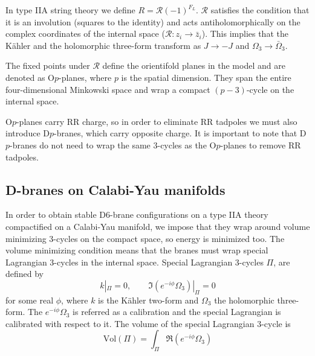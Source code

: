 In type IIA string theory we define $R=\mathcal R (-1)^{F_L}$.
$\mathcal R$ satisfies the condition that it is an involution (squares to the identity) and 
acts antiholomorphically on the complex coordinates of the internal space ($\mathcal R: z_i \to \bar z_i$).
This implies that the Kähler and the holomorphic three-form transform as $J\to -J$ and $\Omega_3 \to \bar \Omega_3$.



The fixed points under $\mathcal R$ define the orientifold planes in the model and are denoted
as O$p$-planes, where $p$ is the spatial dimension.
They span the entire four-dimensional Minkowski space and wrap a compact $(p-3)$-cycle on the internal space.

O$p$-planes carry RR charge, so in order to eliminate RR tadpoles we must also introduce D$p$-branes,
which carry opposite charge.
It is important to note that D$p$-branes do not need to wrap the same 3-cycles as the O$p$-planes
to remove RR tadpoles.


\subsection{D-branes on Calabi-Yau manifolds}

In order to obtain stable D6-brane configurations on a type IIA theory compactified on a Calabi-Yau manifold, 
we impose that they wrap around volume minimizing 3-cycles on the compact space, so energy is minimized too.
The volume minimizing condition means that the branes must wrap special Lagrangian 3-cycles in the internal space.
Special Lagrangian 3-cycles $\Pi$, are defined by
\begin{equation}
  k|_\Pi = 0 , \qquad \Im (e^{-i\phi}\Omega_3)|_\Pi=0
\end{equation}
for some real $\phi$, where $k$ is the Kähler two-form and $\Omega_3$ the holomorphic three-form.
The $e^{-i\phi}\Omega_3$ is referred as a calibration and the special Lagrangian is calibrated with respect to it.%
The volume of the special Lagrangian 3-cycle is
\begin{equation}
  \mathrm{Vol}(\Pi)=\int_\Pi \Re(e^{-i\phi}\Omega_3)
\end{equation}

